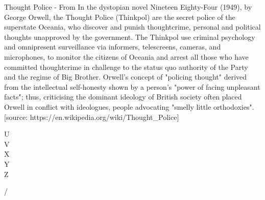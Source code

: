 \documentclass{article} %
\begin{document}
{  Thought Police - From \NineteenEightyFour{} In the dystopian novel Nineteen Eighty-Four (1949), by George Orwell, the Thought Police (Thinkpol) are the secret police of the superstate Oceania, who discover and punish thoughtcrime, personal and political thoughts unapproved by the government. The Thinkpol use criminal psychology and omnipresent surveillance via informers, telescreens, cameras, and microphones, to monitor the citizens of Oceania and arrest all those who have committed thoughtcrime in challenge to the status quo authority of the Party and the regime of Big Brother. Orwell's concept of "policing thought" derived from the intellectual self-honesty shown by a person's "power of facing unpleasant facts"; thus, criticising the dominant ideology of British society often placed Orwell in conflict with ideologues, people advocating "smelly little orthodoxies". [source: https://en.wikipedia.org/wiki/Thought_Police]
  
  U \\
  
  V \\
  
  X \\
  
  Y \\
  
  Z \\
  
  }/
\end{document}
